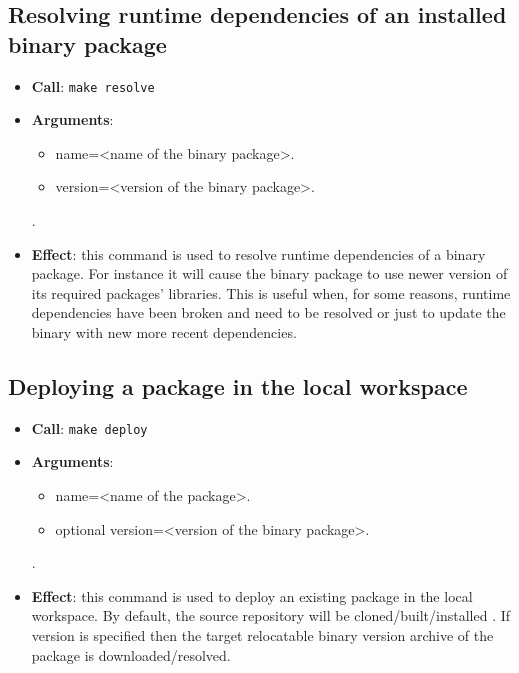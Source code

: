 \documentclass[12pt,a4paper]{article}
\begin{document}
\subsection{Resolving runtime dependencies of an installed binary package}
\begin{itemize}
\item \textbf{Call}: \texttt{make resolve}
\item \textbf{Arguments}:
\begin{itemize}
\item name=<name of the binary package>.
\item version=<version of the binary package>.
\end{itemize}. 
\item \textbf{Effect}: this command is used to resolve runtime dependencies of a binary package. For instance it will cause the binary package to use newer version of its required packages' libraries. This is useful when, for some reasons, runtime dependencies have been broken and need to be resolved or just to update the binary with new more recent dependencies.
\end{itemize}

\subsection{Deploying a package in the local workspace}
\begin{itemize}
\item \textbf{Call}: \texttt{make deploy}
\item \textbf{Arguments}:
\begin{itemize}
\item name=<name of the package>.
\item {optional} version=<version of the binary package>.
\end{itemize}. 
\item \textbf{Effect}: this command is used to deploy an existing package in the local workspace. By default, the source repository will be cloned/built/installed . If version is specified then the target relocatable binary version archive of the package is downloaded/resolved.
\end{itemize}
\end{document}
